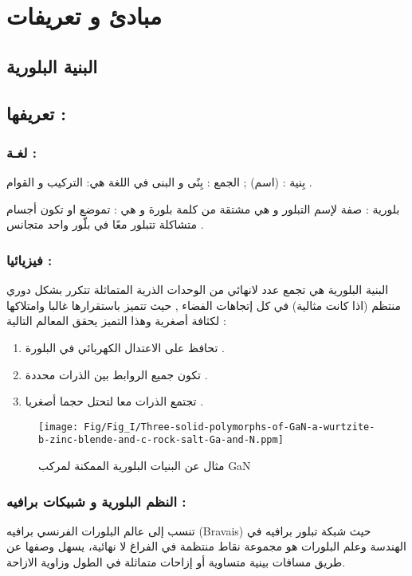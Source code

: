 \section{مبادئ و تعريفات}

\subsection{البنية البلورية }

\subsection*{تعريفها :}
\subsubsection*{لغـة : }
\begin{list}{}{}
	\item 
	بِنية : (اسم) ; الجمع : بِنًى و البنى في اللغة هي: التركيب و القوام .
\item	
بلورية : صفة لإسم التبلور و هي مشتقة من كلمة بلورة و هي : تموضع او تكون أجسام متشاكلة تتبلور معًا في بلّور واحد متجانس . \cite{a4}
\end{list}

\subsubsection*{فيزيائيا :}
البنیة البلوریة هي تجمع عدد لانهائي من الوحدات الذرية المتماثلة تتكرر بشكل دوري منتظم (اذا كانت مثالية) في كل إتجاهات الفضاء , حيث تتميز باستقرارها غالبا وامتلاكها لكثافة أصغرية وهذا التميز يحقق المعالم التالية :
\begin{enumerate}
	\item
	تحافظ على الاعتدال الكهربائي في البلورة .
	\item
	تكون جميع الروابط بين الذرات محددة .
	\item
	تجتمع الذرات معا لتحتل حجما أصغريا . 
\end{enumerate}

\begin{figure}[bh]
	\centering
	\texttt{[image: Fig/Fig\_I/Three-solid-polymorphs-of-GaN-a-wurtzite-b-zinc-blende-and-c-rock-salt-Ga-and-N.ppm]}
	\caption{مثال عن البنيات البلورية الممكنة لمركب GaN }
	\label{fig:three-solid-polymorphs-of-gan-a-wurtzite-b-zinc-blende-and-c-rock-salt-ga-and-n}
\end{figure}
\FloatBarrier

\subsubsection{النظم البلورية و شبيكات برافيه :}
تنسب إلى عالم البلورات الفرنسي برافيه (Bravais) حيث شبكة تبلور برافيه في الهندسة وعلم البلورات هو مجموعة نقاط منتظمة في الفراغ لا نهائية، يسهل وصفها عن طريق مسافات بينية متساوية أو إزاحات متماثلة في الطول وزاوية الازاحة. 

